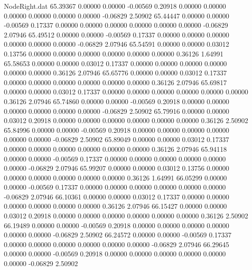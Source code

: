 \begin{filecontents}{NodeRight.dat}
  65.39367    0.00000    0.00000    -0.00569    0.20918    0.00000    0.00000    0.00000    0.00000    0.00000    0.00000   -0.06829    2.50902
  65.44447    0.00000    0.00000    -0.00569    0.17337    0.00000    0.00000    0.00000    0.00000    0.00000    0.00000   -0.06829    2.07946
  65.49512    0.00000    0.00000    -0.00569    0.17337    0.00000    0.00000    0.00000    0.00000    0.00000    0.00000   -0.06829    2.07946
  65.54591    0.00000    0.00000     0.03012    0.13756    0.00000    0.00000    0.00000    0.00000    0.00000    0.00000    0.36126    1.64991
  65.58653    0.00000    0.00000     0.03012    0.17337    0.00000    0.00000    0.00000    0.00000    0.00000    0.00000    0.36126    2.07946
  65.65776    0.00000    0.00000     0.03012    0.17337    0.00000    0.00000    0.00000    0.00000    0.00000    0.00000    0.36126    2.07946
  65.69817    0.00000    0.00000     0.03012    0.17337    0.00000    0.00000    0.00000    0.00000    0.00000    0.00000    0.36126    2.07946
  65.74860    0.00000    0.00000    -0.00569    0.20918    0.00000    0.00000    0.00000    0.00000    0.00000    0.00000   -0.06829    2.50902
  65.79916    0.00000    0.00000     0.03012    0.20918    0.00000    0.00000    0.00000    0.00000    0.00000    0.00000    0.36126    2.50902
  65.84996    0.00000    0.00000    -0.00569    0.20918    0.00000    0.00000    0.00000    0.00000    0.00000    0.00000   -0.06829    2.50902
  65.89049    0.00000    0.00000     0.03012    0.17337    0.00000    0.00000    0.00000    0.00000    0.00000    0.00000    0.36126    2.07946
  65.94118    0.00000    0.00000    -0.00569    0.17337    0.00000    0.00000    0.00000    0.00000    0.00000    0.00000   -0.06829    2.07946
  65.99207    0.00000    0.00000     0.03012    0.13756    0.00000    0.00000    0.00000    0.00000    0.00000    0.00000    0.36126    1.64991
  66.05299    0.00000    0.00000    -0.00569    0.17337    0.00000    0.00000    0.00000    0.00000    0.00000    0.00000   -0.06829    2.07946
  66.10361    0.00000    0.00000     0.03012    0.17337    0.00000    0.00000    0.00000    0.00000    0.00000    0.00000    0.36126    2.07946
  66.15427    0.00000    0.00000     0.03012    0.20918    0.00000    0.00000    0.00000    0.00000    0.00000    0.00000    0.36126    2.50902
  66.19489    0.00000    0.00000    -0.00569    0.20918    0.00000    0.00000    0.00000    0.00000    0.00000    0.00000   -0.06829    2.50902
  66.24572    0.00000    0.00000    -0.00569    0.17337    0.00000    0.00000    0.00000    0.00000    0.00000    0.00000   -0.06829    2.07946
  66.29645    0.00000    0.00000    -0.00569    0.20918    0.00000    0.00000    0.00000    0.00000    0.00000    0.00000   -0.06829    2.50902

\end{filecontents}
